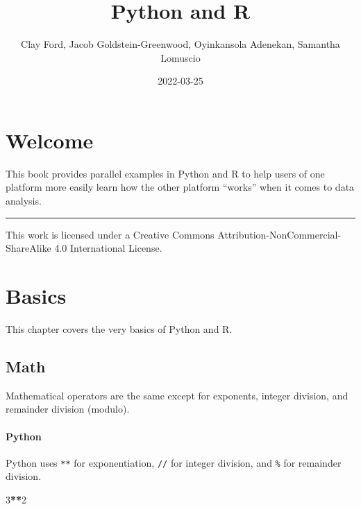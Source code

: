 \documentclass[
]{book}
\title{Python and R}
\author{Clay Ford, Jacob Goldstein-Greenwood, Oyinkansola Adenekan, Samantha Lomuscio}
\date{2022-03-25}
\newenvironment{Shaded}{\begin{snugshade}}{\end{snugshade}}
\newcommand{\DecValTok}[1]{\textcolor[rgb]{0.00,0.00,0.81}{#1}}
\newcommand{\OperatorTok}[1]{\textcolor[rgb]{0.81,0.36,0.00}{\textbf{#1}}}
\begin{document}
\maketitle

{
\setcounter{tocdepth}{1}
\tableofcontents
}
\hypertarget{welcome}{%
\chapter*{Welcome}\label{welcome}}

This book provides parallel examples in Python and R to help users of one platform more easily learn how the other platform ``works'' when it comes to data analysis.

\begin{center}\rule{0.5\linewidth}{0.5pt}\end{center}

This work is licensed under a Creative Commons Attribution-NonCommercial-ShareAlike 4.0 International License.

\hypertarget{basics}{%
\chapter{Basics}\label{basics}}

This chapter covers the very basics of Python and R.

\hypertarget{math}{%
\section{Math}\label{math}}

Mathematical operators are the same except for exponents, integer division, and remainder division (modulo).

\hypertarget{python}{%
\subsubsection*{Python}\label{python}}

Python uses \texttt{**} for exponentiation, \texttt{//} for integer division, and \texttt{\%} for remainder division.

\begin{Shaded}
\begin{Highlighting}[]
\DecValTok{3}\OperatorTok{**}\DecValTok{2}
\end{Highlighting}
\end{Shaded}
\end{document}
